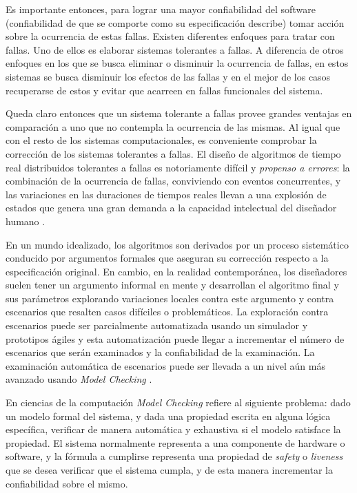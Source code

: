 \documentclass[pdftex,a4paper,12pt]{book}
\begin{document}
Es importante entonces, para lograr una mayor confiabilidad del software (confiabilidad de que se comporte como su especificaci\'on describe) tomar acci\'on sobre la ocurrencia de estas fallas. Existen diferentes enfoques para tratar con fallas. Uno de ellos es elaborar sistemas tolerantes a fallas. A diferencia de otros enfoques en los que se busca eliminar o disminuir la ocurrencia de fallas, en estos sistemas se busca disminuir los efectos de las fallas y en el mejor de los casos recuperarse de estos y evitar que acarreen en fallas funcionales del sistema.

Queda claro entonces que un sistema tolerante a fallas provee grandes ventajas en comparaci\'on a uno que no contempla la ocurrencia de las mismas. Al igual que con el resto de los sistemas computacionales, es conveniente comprobar la correcci\'on de los sistemas tolerantes a fallas. El dise\~no de algoritmos de tiempo real distribuidos tolerantes a fallas es notoriamente dif\'icil y \emph{propenso a errores}: la combinaci\'on de la ocurrencia de fallas, conviviendo con eventos concurrentes, y las variaciones en las duraciones de tiempos reales llevan a una explosi\'on de estados que genera una gran demanda a la capacidad intelectual del dise\~nador humano \cite{SteinerRushby}.

En un mundo idealizado, los algoritmos son derivados por un proceso sistem\'atico conducido por argumentos formales que aseguran su correcci\'on respecto a la especificaci\'on original. En cambio, en la realidad contempor\'anea, los dise\~nadores suelen tener un argumento informal en mente y desarrollan el algoritmo final y sus par\'ametros explorando variaciones locales contra este argumento y contra escenarios que resalten casos dif\'iciles o problem\'aticos. La exploraci\'on contra escenarios puede ser parcialmente automatizada usando un simulador y prototipos \'agiles y esta automatizaci\'on puede llegar a incrementar el n\'umero de escenarios que ser\'an examinados y la confiabilidad de la examinaci\'on. La examinaci\'on autom\'atica de escenarios puede ser llevada a un nivel a\'un m\'as avanzado usando \emph{Model Checking} \cite{Baier}.

En ciencias de la computaci\'on \emph{Model Checking} refiere al siguiente problema: dado un modelo formal del sistema, y dada una propiedad escrita en alguna l\'ogica espec\'ifica, verificar de manera autom\'atica y exhaustiva si el modelo satisface la propiedad. El sistema normalmente representa a una componente de hardware o software, y la f\'ormula a cumplirse representa una propiedad de \emph{safety} o \emph{liveness} que se desea verificar que el sistema cumpla, y de esta manera incrementar la confiabilidad sobre el mismo.
\end{document}
